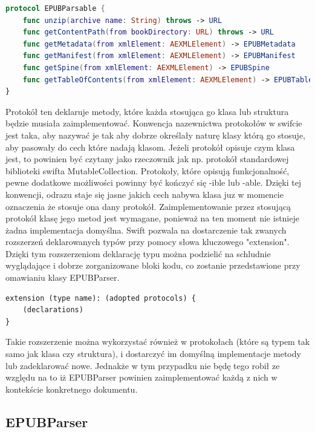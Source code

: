 \begin{lstlisting}[caption={Protokół EPUBParsable.}, language=swift]
protocol EPUBParsable {
    func unzip(archive name: String) throws -> URL
    func getContentPath(from bookDirectory: URL) throws -> URL
    func getMetadata(from xmlElement: AEXMLElement) -> EPUBMetadata
    func getManifest(from xmlElement: AEXMLElement) -> EPUBManifest
    func getSpine(from xmlElement: AEXMLElement) -> EPUBSpine
    func getTableOfContents(from xmlElement: AEXMLElement) -> EPUBTableOfContents
}
\end{lstlisting}

Protokół ten deklaruje metody, które każda stosująca go klasa lub struktura będzie musiała zaimplementować. Konwencja nazewnictwa protokołów w swifcie jest taka, aby nazywać je tak aby dobrze określały naturę klasy którą go stosuje, aby pasowały do cech które nadają klasom. Jeżeli protokół opisuje czym klasa jest, to powinien być czytany jako rzeczownik jak np. protokół standardowej biblioteki swifta MutableCollection. Protokoły, które opisują funkcjonalność, pewne dodatkowe możliwości powinny być kończyć się -ible lub -able. Dzięki tej konwencji, odrazu staje się jasne jakich cech nabywa klasa juz w momencie oznaczenia że stosuje ona dany protokół. Zaimplementowanie przez stosującą protokół klasę jego metod jest wymagane, ponieważ na ten moment nie istnieje żadna implementacja domyślna. Swift pozwala na dostarczenie tak zwanych rozszerzeń deklarowanych typów przy pomocy słowa kluczowego "extension". Dzięki tym rozszerzeniom deklarację typu można podzielić na schludnie wyglądające i dobrze zorganizowane bloki kodu, co zostanie przedstawione przy omawianiu klasy EPUBParser.

\begin{lstlisting}[caption={Deklaracja wyrażenia "extension"\cite{theSwiftProgrammingLanguageDeclarations}.},language=swift-reference]
extension (type name): (adopted protocols) {
    (declarations)
}
\end{lstlisting}

Takie rozszerzenie można wykorzystać również w protokołach (które są typem tak samo jak klasa czy struktura), i dostarczyć im domyślną implementacje metody lub zadeklarować nowe. Jednakże w tym przypadku nie będę tego robił ze względu na to iż EPUBParser powinien zaimplementować każdą z nich w kontekście konkretnego dokumentu.

\subsection{EPUBParser}

